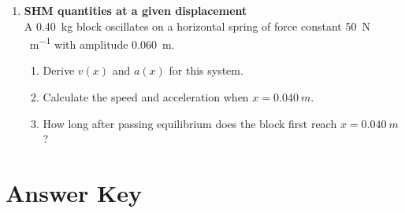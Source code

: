 \documentclass[12pt]{article}
\begin{document}
\begin{enumerate}[label=\textbf{Q\arabic*.}]
\item \textbf{SHM quantities at a given displacement}\\
A \SI{0.40}{kg} block oscillates on a horizontal spring of force constant \SI{50}{N\,m^{-1}} with amplitude \SI{0.060}{m}.
\begin{enumerate}[label=(\alph*)]
\item Derive $v(x)$ and $a(x)$ for this system.
\item Calculate the speed and acceleration when $x=\SI{0.040}{m}$.
\item How long after passing equilibrium does the block first reach $x=\SI{0.040}{m}$?
\end{enumerate}
\end{enumerate}

\clearpage
\section*{Answer Key}
\end{document}
